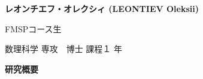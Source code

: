 \documentclass[a4j,twocolumn]{jarticle}
\begin{document}



{\bf  レオンチエフ・オレクシィ  (LEONTIEV Oleksii)}


FMSPコース生


{数理科学 }専攻　{博士 }課程{１ }年


\vspace{0.2cm}
\noindent
{\bf 研究概要}
\end{document}
